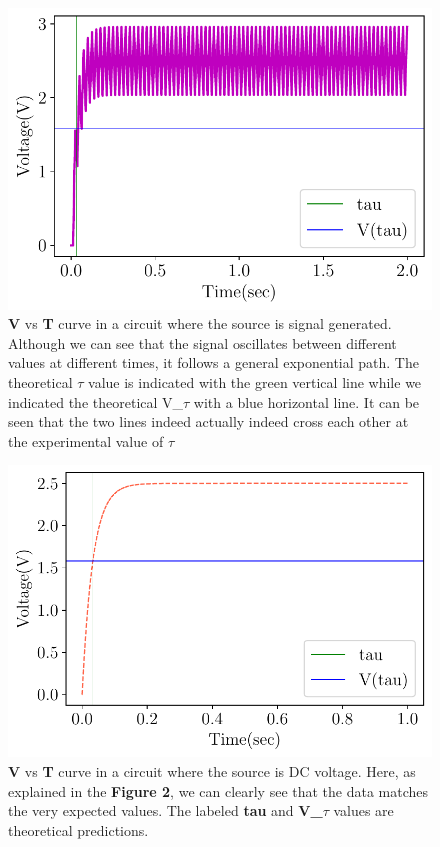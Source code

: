 \documentclass[twocolumn]{article}\usepackage[english]{babel}
\begin{document}
\begin{figure}
\includegraphics[width=\linewidth]{images/v2/Signal Generated RC Circuit Plot.pdf}
\caption{\textbf{V} vs \textbf{T} curve in a circuit where the source is signal generated. Although we can see that the signal oscillates between different values at different times, it follows a general exponential path. The theoretical $\tau$ value is indicated with the green vertical line while we indicated the theoretical V_$\tau$ with a blue horizontal line. It can be seen that the two lines indeed actually indeed cross each other at the experimental value of $\tau$  }
  \label{fig:Signal RC Voltage}
\end{figure}

\begin{figure}
\includegraphics[width=\linewidth]{images/v2/RC Circuit Plot.pdf}
\caption{\textbf{V} vs \textbf{T} curve in a circuit where the source is DC voltage. Here, as explained in the \textbf{Figure 2}, we can clearly see that the data matches the very expected values. The labeled \textbf{tau} and \textbf{V_$\tau$} values are theoretical predictions.}
  \label{fig:DC RC Voltage}
\end{figure}
\end{document}
